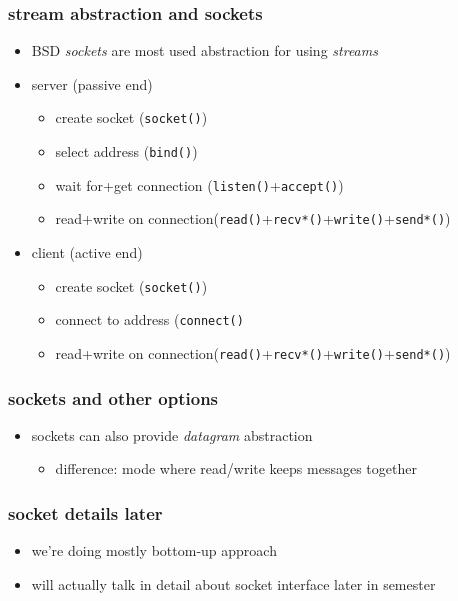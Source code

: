 \begin{frame}\frametitle{stream abstraction and sockets}
    \begin{itemize}
    \item BSD \textit{sockets} are most used abstraction for using \textit{streams}
    \item server (passive end)
        \begin{itemize}
        \item create socket (\texttt{socket()})
        \item select address (\texttt{bind()})
        \item wait for+get connection (\texttt{listen()}+\texttt{accept()})
        \item read+write on connection(\texttt{read()}+\texttt{recv*()}+\texttt{write()}+\texttt{send*()})
        \end{itemize}
    \item client (active end)
        \begin{itemize}
        \item create socket (\texttt{socket()})
        \item connect to address (\texttt{connect()}
        \item read+write on connection(\texttt{read()}+\texttt{recv*()}+\texttt{write()}+\texttt{send*()})
        \end{itemize}
    \end{itemize}
\end{frame}

\begin{frame}\frametitle{sockets and other options}
    \begin{itemize}
    \item sockets can also provide \textit{datagram} abstraction
        \begin{itemize}
        \item difference: mode where read/write keeps messages together
        \end{itemize}
    \end{itemize}
\end{frame}

\begin{frame}\frametitle{socket details later}
    \begin{itemize}
    \item we're doing mostly bottom-up approach
    \item will actually talk in detail about socket interface later in semester
    \end{itemize}
\end{frame}
